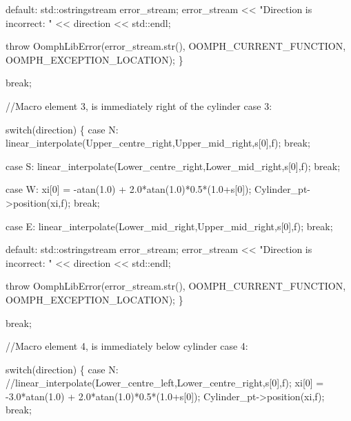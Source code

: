 \begin{DoxyCodeInclude}
     \textcolor{keywordflow}{default}:
      std::ostringstream error\_stream;
      error\_stream << \textcolor{stringliteral}{"Direction is incorrect: "} << direction << std::endl;
      
      \textcolor{keywordflow}{throw} OomphLibError(error\_stream.str(),
                          OOMPH\_CURRENT\_FUNCTION,
                          OOMPH\_EXCEPTION\_LOCATION);
     \}
    
    \textcolor{keywordflow}{break};

    \textcolor{comment}{//Macro element 3, is immediately right of the cylinder}
   \textcolor{keywordflow}{case} 3:

    \textcolor{keywordflow}{switch}(direction)
     \{
     \textcolor{keywordflow}{case} N:
       linear\_interpolate(Upper\_centre\_right,Upper\_mid\_right,s[0],f);
      \textcolor{keywordflow}{break};
      
     \textcolor{keywordflow}{case} S:  
       linear\_interpolate(Lower\_centre\_right,Lower\_mid\_right,s[0],f);
      \textcolor{keywordflow}{break};

     \textcolor{keywordflow}{case} W:
      xi[0] = -atan(1.0) + 2.0*atan(1.0)*0.5*(1.0+s[0]);
      Cylinder\_pt->position(xi,f);
      \textcolor{keywordflow}{break};

     \textcolor{keywordflow}{case} E:
       linear\_interpolate(Lower\_mid\_right,Upper\_mid\_right,s[0],f);
      \textcolor{keywordflow}{break};

     \textcolor{keywordflow}{default}:
      std::ostringstream error\_stream;
      error\_stream << \textcolor{stringliteral}{"Direction is incorrect: "} << direction << std::endl;

      \textcolor{keywordflow}{throw} OomphLibError(error\_stream.str(),
                          OOMPH\_CURRENT\_FUNCTION,
                          OOMPH\_EXCEPTION\_LOCATION);
     \}

    \textcolor{keywordflow}{break};
    
    \textcolor{comment}{//Macro element 4, is immediately below cylinder}
   \textcolor{keywordflow}{case} 4:
    
    \textcolor{keywordflow}{switch}(direction)
     \{
     \textcolor{keywordflow}{case} N:
      \textcolor{comment}{//linear\_interpolate(Lower\_centre\_left,Lower\_centre\_right,s[0],f);}
      xi[0] = -3.0*atan(1.0) + 2.0*atan(1.0)*0.5*(1.0+s[0]);
      Cylinder\_pt->position(xi,f);
      \textcolor{keywordflow}{break};
      

\end{DoxyCodeInclude}
